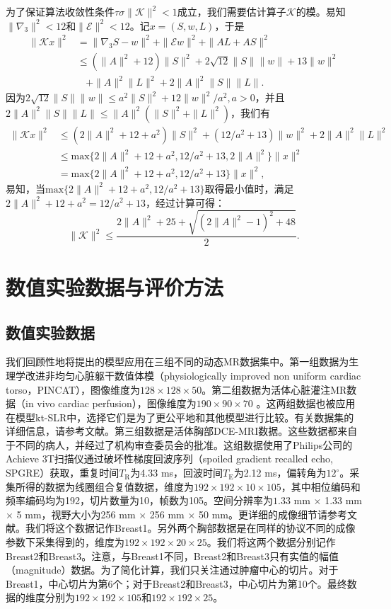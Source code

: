 为了保证算法收敛性条件$\tau\sigma\|\mathcal{K}\|^2<1$成立，我们需要估计算子$\mathcal{K}$的模。易知$\|\nabla_3\|^2<12$和$\|\mathcal{E}\|^2<12$。记$x=(S,w,L)$，于是
\begin{equation*}
	\begin{aligned}
		\|\mathcal{K}x\|^2&=\|\nabla_3 S-w\|^2+\|\mathcal{E} w\|^2+\|AL+AS\|^2 \\
		& \leq (\|A\|^2+12)\|S\|^2+2\sqrt{12}\|S\|\|w\|+13\|w\|^2\\
		& \ \ \ \ +\|A\|^2\|L\|^2+2\|A\|^2\|S\|\|L\|.
	\end{aligned}
\end{equation*}
因为$2\sqrt{12}\|S\|\|w\|\leq a^2\|S\|^2+12\|w\|^2/a^2, a>0$，并且$2\|A\|^2\|S\|\|L\|\leq \|A\|^2(\|S\|^2+\|L\|^2)$，我们有
\begin{equation*}
	\begin{aligned}
		\|\mathcal{K}x\|^2&\leq(2\|A\|^2+12+a^2)\|S\|^2+(12/a^2+13)\|w\|^2+2\|A\|^2\|L\|^2 \\
		&\leq \mathrm{max}\{2\|A\|^2+12+a^2,12/a^2+13,2\|A\|^2\}\|x\|^2 \\
		& = \mathrm{max}\{2\|A\|^2+12+a^2,12/a^2+13\}\|x\|^2,
	\end{aligned}
\end{equation*}
易知，当$\mathrm{max}\{2\|A\|^2+12+a^2,12/a^2+13\}$取得最小值时，满足$2\|A\|^2+12+a^2=12/a^2+13$，经过计算可得：
$$\|\mathcal{K}\|^2\leq \frac{2\|A\|^2+25+\sqrt{(2\|A\|^2-1)^2+48}}{2}.$$ 

\section{数值实验数据与评价方法}
\subsection{数值实验数据}
我们回顾性地将提出的模型应用在三组不同的动态MR数据集中。第一组数据为生理学改进非均匀心脏躯干数值体模（physiologically improved non uniform cardiac torso，PINCAT），图像维度为$128\times 128\times 50$。第二组数据为活体心脏灌注MR数据（in vivo cardiac perfusion），图像维度为$190\times 90\times 70$ 。这两组数据也被应用在模型kt-SLR中，选择它们是为了更公平地和其他模型进行比较。有关数据集的详细信息，请参考文献\cite{segars2002study, sharif2007adaptive}。第三组数据是活体胸部DCE-MRI数据。这些数据都来自于不同的病人，并经过了机构审查委员会的批准。这组数据使用了Philips公司的Achieve 3T扫描仪通过破坏性梯度回波序列（spoiled gradient recalled echo, SPGRE）获取，重复时间$T_\mathrm{R}$为4.33 ms，回波时间$T_\mathrm{E}$为2.12 ms，偏转角为$12^\circ$。采集所得的数据为线圈组合复值数据，维度为$192\times 192\times 10\times 105$，其中相位编码和频率编码均为192，切片数量为10，帧数为105。空间分辨率为$1.33$ mm $\times$ 1.33 mm $\times$ 5 mm，视野大小为256 mm $\times$ 256 mm $\times$ 50 mm。更详细的成像细节请参考文献\cite{li}。我们将这个数据记作Breast1。另外两个胸部数据是在同样的协议不同的成像参数下采集得到的，维度为$192\times 192\times 20\times 25$。我们将这两个数据分别记作Breast2和Breast3。注意，与Breast1不同，Breast2和Breast3只有实值的幅值（magnitude）数据。为了简化计算，我们只关注通过肿瘤中心的切片。对于Breast1，中心切片为第6个；对于Breast2和Breast3，中心切片为第10个。最终数据的维度分别为$192\times 192\times 105$和$192\times 192\times 25$。

